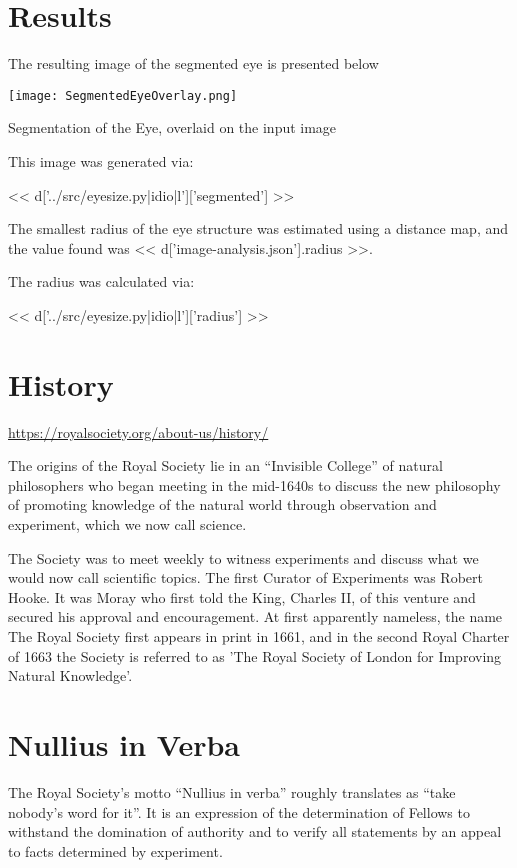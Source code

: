 \documentclass{article}
\begin{document}
\section{Results}

The resulting image of the segmented eye is presented below

\begin{graphics}
\texttt{[image: SegmentedEyeOverlay.png]}
\caption{Segmentation of the Eye, overlaid on the input image}
\end{graphics}

This image was generated via:

<< d['../src/eyesize.py|idio|l']['segmented'] >>

The smallest radius of the eye structure was estimated using a distance map,
and the value found was << d['image-analysis.json'].radius >>.

The radius was calculated via:

<< d['../src/eyesize.py|idio|l']['radius'] >>

\section{History}

\url{https://royalsociety.org/about-us/history/}

The origins of the Royal Society lie in an ``Invisible College'' of natural
philosophers who began meeting in the mid-1640s to discuss the new philosophy
of promoting knowledge of the natural world through observation and experiment,
which we now call science.

The Society was to meet weekly to witness experiments and discuss what we would
now call scientific topics. The first Curator of Experiments was Robert Hooke.
It was Moray who first told the King, Charles II, of this venture and secured
his approval and encouragement. At first apparently nameless, the name The
Royal Society first appears in print in 1661, and in the second Royal Charter
of 1663 the Society is referred to as 'The Royal Society of London for
Improving Natural Knowledge'.

\section{Nullius in Verba}

The Royal Society's motto ``Nullius in verba'' roughly translates as ``take
nobody's word for it''. It is an expression of the determination of Fellows to
withstand the domination of authority and to verify all statements by an appeal
to facts determined by experiment.
\end{document}
